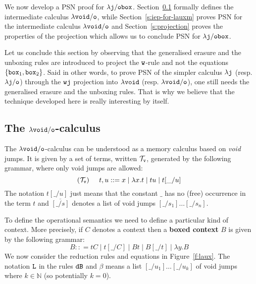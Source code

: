 \documentclass{LMCS}
\newcommand{\sep}{\hspace*{0.5cm}}
\renewcommand{\>}{\rightarrow}
\def\lam{\lambda}
\newcommand{\nat}{{\mathbb N}}
\newcommand{\B}{{\tt dB}}
\newcommand{\dis}{{\tt j}}
\newcommand{\ldis}{\lam{\dis}}
\newcommand{\Gc}{{\tt w}}
\newcommand{\set}[1]{ \{ #1 \}}
\renewcommand{\vec}[1]{\overline{#1}}
\newcommand{\termsv}{\mathcal{T}_{\tt v}}
\newcommand{\deft}[1]{{\bf #1}}
\newcommand{\wfc}{\Gc\dis}
\newcommand{\modulo}[2]{#1/#2}
\newcommand{\osym}{{\tt o}}
\newcommand{\ldiso}{\ldis/{\osym}}
\newcommand{\ldisf}{\lam \modulo{\dis}{\fsymb}}
\newcommand{\fsymb}{\osymb\boite}
\newcommand{\osymb}{{\tt o}}
\newcommand{\aux}{{\tt void}}
\newcommand{\laux}{\lam\aux}
\newcommand{\lauxm}{\lam\modulo{ \aux }{ \osymb }}
\newcommand{\List}{{\tt L}}
\newcommand{\boite}{{\tt box}}
\newcommand{\sigt}{\boite_1}
\newcommand{\sigq}{\boite_2}
\newcommand{\void}{\_}
\begin{document}
\noindent We now develop a PSN proof for $\ldisf$. 
Section~\ref{s:lauxm}  formally defines the intermediate calculus
$\lauxm$, 
while Section~\ref{s:iep-for-lauxm} proves PSN
for the intermediate calculus  $\lauxm$ and
Section~\ref{s:projection} proves the properties of the projection which allows us to conclude PSN for $\ldisf$. 

Let us conclude this section by observing that the 
  generalised erasure and the unboxing rules are 
introduced to project the $\Gc$-rule and not the 
equations 
$\set{\sigt, \sigq}$. Said in other words, 
to prove PSN of the simpler calculus $\ldis$ (resp. $\ldiso$) through the $\wfc$
  projection into $\laux$ (resp. $\lauxm$), one still needs the generalised erasure and the unboxing rules. That is why we
  believe that the technique  developed here is really interesting by itself.


\subsection{The $\lauxm$-calculus}
\label{s:lauxm}

The $\lauxm$-calculus can be understood as a memory calculus
based on \textit{void} jumps. It is given by a set of
  terms, written $\termsv$,  generated by the following grammar, where only
void jumps are allowed:
\[  (\termsv) \sep t, u :: = x \mid \lam x. t \mid t u \mid t[\void/u] \]
The notation $t[\void/u]$ just means that the constant $\void$
has no (free) occurrence in the term $t$ and $\vec{[\void/s]}$ 
denotes a list of void jumps $[\void/s_1]\ldots [\void/s_n]$. 

To define the operational semantics we need to define a particular
kind of context. More precisely, if $C$ denotes a context then a
\deft{boxed context} $B$ is given by the following grammar:
\[ B:: = t C \mid  t[\void/C] \mid B t \mid B[\void/t] \mid \lam y. B \]
We now consider the  reduction rules
 and equations in Figure~\ref{f:laux}. 
The notation $\List$ in the rules $\B$ and $\beta$
means a list $[\void/u_1]\ldots[\void/u_k]$ 
of void jumps where  $k\in\nat$ (so
potentially $k=0$).
\end{document}
